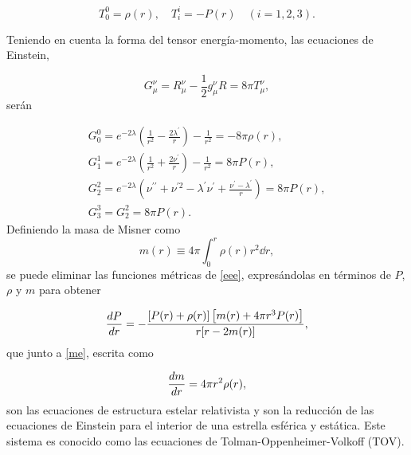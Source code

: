 \begin{equation}
T _ { 0 } ^ { 0 } = \rho(r) , \quad T _ { i } ^ { i } = - P(r) \quad ( i=1,2,3 ).  
\end{equation}

Teniendo en cuenta la forma del tensor energía-momento, las ecuaciones de Einstein,

\begin{equation}
    G _ { \mu } ^ { \nu } = R _ { \mu } ^ { \nu } - \frac { 1 } { 2 } g _ { \mu } ^ { \nu } R = 8 \pi T _ { \mu } ^ { \nu },
\end{equation}
serán

\begin{equation}
    \begin{array} { l } { G _ { 0 } ^ { 0 } = e ^ { - 2 \lambda } \left( \frac { 1 } { r ^ { 2 } } - \frac { 2 \lambda ^ { \prime } } { r } \right) - \frac { 1 } { r ^ { 2 } } = - 8 \pi  \rho ( r ) }, \\ { G _ { 1 } ^ { 1 } = e ^ { - 2 \lambda } \left( \frac { 1 } { r ^ { 2 } } + \frac { 2 \nu ^ { \prime } } { r } \right) - \frac { 1 } { r ^ { 2 } } = 8 \pi  P ( r ) }, \\ { G _ { 2 } ^ { 2 } = e ^ { - 2 \lambda } \left( \nu ^ { \prime \prime } + \nu ^ { \prime 2 } - \lambda ^ { \prime } \nu ^ { \prime } + \frac { \nu ^ { \prime } - \lambda ^ { \prime } } { r } \right) = 8 \pi  P ( r ) }, \\ { G _ { 3 } ^ { 3 } = G _ { 2 } ^ { 2 } = 8 \pi  P ( r ) }. \end{array}
    \label{eee}
\end{equation}
Definiendo la masa de Misner como
\begin{equation}
    m ( r ) \equiv 4 \pi \int _ { 0 } ^ { r } \rho ( r ) r ^ { 2 } \dd{r},
    \label{me}
\end{equation}
se puede eliminar las funciones métricas de \eqref{eee}, expresándolas en términos de $P$, $\rho$ y $m$ para obtener 

\begin{equation}
    \dv{P}{r} = - \frac { [ P ( r ) + \rho ( r ) ] \left[ m ( r ) + 4 \pi r ^ { 3 } P ( r ) \right] } { r [ r - 2 m ( r ) ] },
    \label{dptov}
\end{equation}
que junto a \eqref{me}, escrita como

\begin{equation}
    \dv{m}{r} = 4 \pi r ^ { 2 } \rho(r),
    \label{dmtov}
\end{equation}
son las ecuaciones de estructura estelar relativista y son la reducción de las ecuaciones de Einstein para el interior de una estrella esférica y estática. Este sistema es conocido como las ecuaciones de Tolman-Oppenheimer-Volkoff (TOV).

